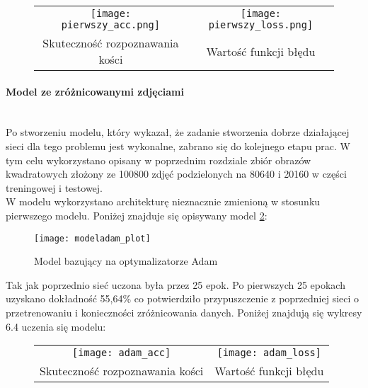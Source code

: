 \begin{figure}[h!]
\begin{center}
\begin{tabular}{cc}
\texttt{[image: pierwszy\_acc.png]} &
\texttt{[image: pierwszy\_loss.png]} \\
 Skuteczność rozpoznawania kości & Wartość funkcji błędu\\
\end{tabular}
\label{fig:first_plots}
\end{center}
\end{figure}

\paragraph{Model ze zróżnicowanymi zdjęciami} \mbox{}\\
Po stworzeniu modelu, który wykazał, że zadanie stworzenia dobrze działającej sieci dla
tego problemu jest wykonalne, zabrano się do kolejnego etapu prac. W tym celu
wykorzystano opisany w poprzednim rozdziale zbiór obrazów kwadratowych złożony ze 100800 zdjęć
podzielonych na 80640 i 20160 w części treningowej i testowej.\\
W modelu wykorzystano architekturę nieznacznie zmienioną w stosunku pierwszego modelu.
Poniżej znajduje się opisywany model \ref{fig:adam}: \newpage

\begin{figure}[h!]
\centering
\texttt{[image: modeladam\_plot]}
\caption{Model bazujący na optymalizatorze Adam}
\label{fig:adam}
\end{figure}
Tak jak poprzednio sieć uczona była przez 25 epok.
Po pierwszych 25 epokach uzyskano dokładność 55,64\% co potwierdziło przypuszczenie
z poprzedniej sieci o przetrenowaniu i konieczności zróżnicowania danych.
Poniżej znajdują się wykresy 6.4 uczenia się modelu:

\begin{figure}[h!]
\begin{center}
\begin{tabular}{cc}
\texttt{[image: adam\_acc]} &
\texttt{[image: adam\_loss]} \\
 Skuteczność rozpoznawania kości & Wartość funkcji błędu\\
\end{tabular}
\label{fig:adam_plots}
\end{center}
\end{figure}

